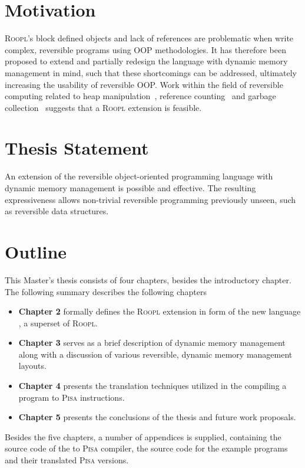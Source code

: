 \section{Motivation}
\label{sec:motivation}
\textsc{Roopl}'s block defined objects and lack of references are problematic when write complex, reversible programs using OOP methodologies. It has therefore been proposed to extend and partially redesign the language with dynamic memory management in mind, such that these shortcomings can be addressed, ultimately increasing the usability of reversible OOP. Work within the field of reversible computing related to heap manipulation~\cite{ha:heap}, reference counting~\cite{tm:refcounting} and garbage collection~\cite{tm:garbage} suggests that a \textsc{Roopl} extension is feasible.


\section{Thesis Statement}
\label{sec:thesis-statement}
An extension of the reversible object-oriented programming language with dynamic memory management is possible and effective. The resulting expressiveness allows non-trivial reversible programming previously unseen, such as reversible data structures.

\section{Outline}
\label{sec:outline}
This Master's thesis consists of four chapters, besides the introductory chapter. The following summary describes the following chapters
\begin{itemize}
    \item \textbf{Chapter 2} formally defines the \textsc{Roopl} extension in form of the new language \rooplpp, a superset of \textsc{Roopl}.
    \item \textbf{Chapter 3} serves as a brief description of dynamic memory management along with a discussion of various reversible, dynamic memory management layouts.
    \item \textbf{Chapter 4} presents the translation techniques utilized in the compiling a \rooplpp program to \textsc{Pisa} instructions.
    \item \textbf{Chapter 5} presents the conclusions of the thesis and future work proposals.
\end{itemize}

Besides the five chapters, a number of appendices is supplied, containing the source code of the \rooplpp to \textsc{Pisa} compiler, the \rooplpp source code for the example programs and their translated \textsc{Pisa} versions.